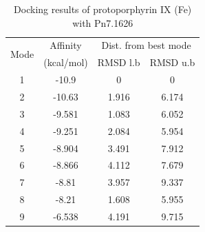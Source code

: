 \documentclass[12pt]{article}
\begin{document}
	\begin{table}[h!]
		\centering
		\caption{Docking results of protoporphyrin IX (Fe) with Pn7.1626}
		\label{table5p_1}
		\begin{tabular}{cccc}
			\toprule
			\multirow{2}{*}{Mode} & Affinity & \multicolumn{2}{c}{Dist. from best mode}\\
			&  (kcal/mol) & RMSD l.b & RMSD u.b\\
			\midrule
			1 &  -10.9   &       0   &       0\\
			2 & -10.63   &   1.916   &   6.174\\
			3 & -9.581   &   1.083   &   6.052\\
			4 & -9.251   &   2.084   &   5.954\\
			5 & -8.904   &   3.491   &   7.912\\
			6 & -8.866   &   4.112   &   7.679\\
			7 &  -8.81   &   3.957   &   9.337\\
			8 &  -8.21   &   1.608   &   5.955\\
			9 & -6.538   &   4.191   &   9.715\\
			\bottomrule
			
		\end{tabular}
	\end{table}
	
\end{document}
